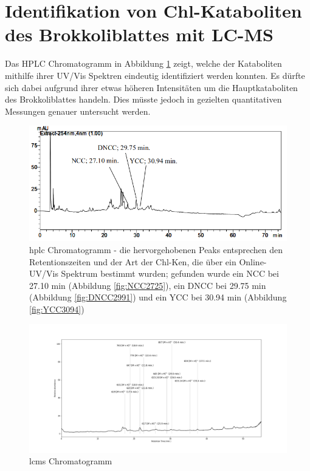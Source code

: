 \section{Identifikation von Chl-Kataboliten des Brokkoliblattes mit LC-MS} \label{sec:ChlKatabolitenBrokkoli}

Das HPLC Chromatogramm in Abbildung \ref{fig:HPLCChromatogramm} zeigt, welche der Kataboliten mithilfe ihrer UV/Vis Spektren eindeutig identifiziert werden konnten. Es dürfte sich dabei aufgrund ihrer etwas höheren Intensitäten um die Hauptkataboliten des Brokkoliblattes handeln. Dies müsste jedoch in gezielten quantitativen Messungen genauer untersucht werden.

\begin{figure}[!htbp]
  \includegraphics[width=\textwidth]{figures/Kapitel6/keineReaktion/VWA_HPLC_Chromatogramm_keineReaktion.png}
  \caption[HPLC Chromatogramm vor der Reaktion, Quelle: Autor]{\gls{hplc} Chromatogramm - die hervorgehobenen Peaks entsprechen den Retentionszeiten und der Art der \gls{Chl-K}en, die über ein Online-UV/Vis Spektrum bestimmt wurden; gefunden wurde ein \gls{NCC} bei 27.10 min (Abbildung \ref{fig:NCC2725}), ein DNCC bei 29.75 min (Abbildung \ref{fig:DNCC2991}) und ein YCC bei 30.94 min (Abbildung \ref{fig:YCC3094})}
  \label{fig:HPLCChromatogramm}
\end{figure}

\begin{figure}[!htbp]
  \centering
  \includegraphics[width=1.4\textwidth, center]{figures/Kapitel6/keineReaktion/Kuerbis_Analyse_keineReaktion2_Ganzes_Spektrum.png}
  \caption[LC-MS Chromatogramm vor der Reaktion, Quelle: Autor]{\gls{lcms} Chromatogramm}
  \label{fig:LCMSChromatogramm}
\end{figure}

